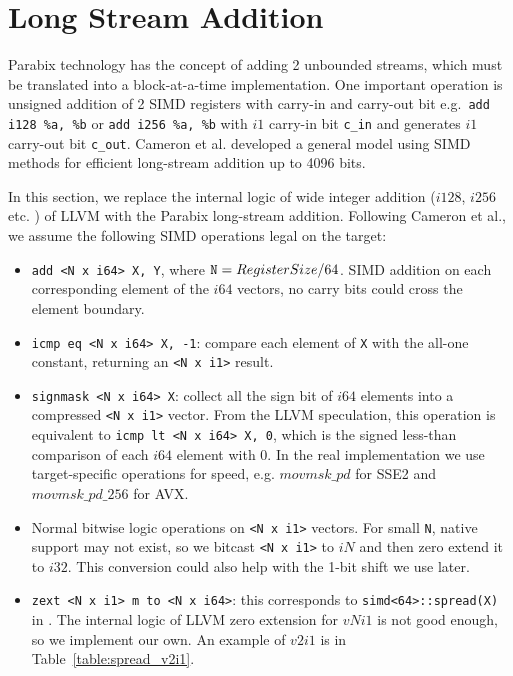 \section{Long Stream Addition}
Parabix technology has the concept of adding 2 unbounded streams, which must be translated into a block-at-a-time implementation\cite{rob_regex}. One important operation is unsigned addition of 2 SIMD registers with carry-in and carry-out bit e.g.\ \verb|add i128 %a, %b| or \verb|add i256 %a, %b| with $i1$ carry-in bit \verb:c_in: and generates $i1$ carry-out bit \verb:c_out:. Cameron et al.\cite{rob_regex} developed a general model using SIMD methods for efficient long-stream addition up to 4096 bits.

In this section, we replace the internal logic of wide integer addition ($i128$, $i256$ etc. ) of LLVM with the Parabix long-stream addition. Following Cameron et al.\cite{rob_regex}, we assume the following SIMD operations legal on the target:
\begin{itemize}
    \item \verb|add <N x i64> X, Y|, where $\text{\tt N} = RegisterSize / 64$. SIMD addition on each corresponding element of the $i64$ vectors, no carry bits could cross the element boundary.
    \item \verb|icmp eq <N x i64> X, -1|: compare each element of {\tt X} with the all-one constant, returning an \verb|<N x i1>| result.
    \item \verb|signmask <N x i64> X|: collect all the sign bit of $i64$ elements into a compressed \verb|<N x i1>| vector. From the LLVM speculation, this operation is equivalent to \verb|icmp lt <N x i64> X, 0|, which is the signed less-than comparison of each $i64$ element with 0. In the real implementation we use target-specific operations for speed, e.g. $movmsk\_pd$ for SSE2 and $movmsk\_pd\_256$ for AVX.
    \item Normal bitwise logic operations on \verb|<N x i1>| vectors. For small {\tt N}, native support may not exist, so we bitcast \verb|<N x i1>| to $iN$ and then zero extend it to $i32$. This conversion could also help with the 1-bit shift we use later.
    \item \verb|zext <N x i1> m to <N x i64>|: this corresponds to \verb|simd<64>::spread(X)| in \cite{rob_regex}. The internal logic of LLVM zero extension for $vNi1$ is not good enough, so we implement our own. An example of $v2i1$ is in Table~\ref{table:spread_v2i1}.
\end{itemize}

